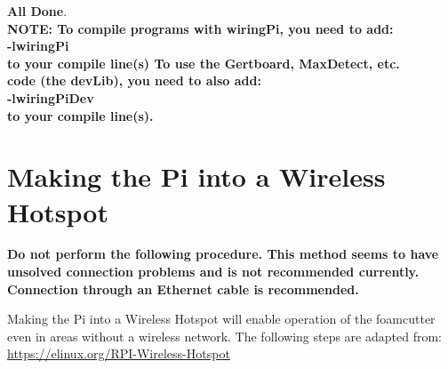 \documentclass[titlepage,12pt,letter]{report}
\numberwithin{equation}{chapter}
\begin{document}
\begin{enumerate}[noitemsep,topsep=0pt]
\textbf{All Done}. \\
	
	\textbf{NOTE: To compile programs with wiringPi, you need to add: \\
	-lwiringPi \\
	to your compile line(s) To use the Gertboard, MaxDetect, etc.\\
	code (the devLib), you need to also add:\\
	-lwiringPiDev\\
	to your compile line(s).\\}
	
\end{enumerate}

\section{Making the Pi into a Wireless Hotspot}
\textbf{Do not perform the following procedure. This method seems to have unsolved connection problems and is not recommended currently. Connection through an Ethernet cable is recommended.}

Making the Pi into a Wireless Hotspot will enable operation of the foamcutter even in areas without a wireless network. The following steps are adapted from: \href{https://elinux.org/RPI-Wireless-Hotspot}{https://elinux.org/RPI-Wireless-Hotspot}
\end{document}
